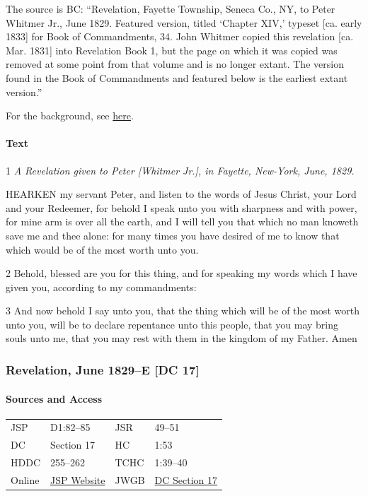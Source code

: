 				The source is BC: ``Revelation, Fayette Township, Seneca Co., NY, to Peter Whitmer Jr., June 1829. Featured version, titled `Chapter XIV,' typeset [ca. early 1833] for Book of Commandments, 34. John Whitmer copied this revelation [ca. Mar. 1831] into Revelation Book 1, but the page on which it was copied was removed at some point from that volume and is no longer extant. The version found in the Book of Commandments and featured below is the earliest extant version.''
				
				For the background, see \hyperref[DC16-HB]{here}.
			
			\paragraph{Text}
			
				1 \textit{A Revelation given to Peter [Whitmer Jr.], in Fayette, New-York, June, 1829.}
				
				HEARKEN my servant Peter, and listen to the words of Jesus Christ, your Lord and your Redeemer, for behold I speak unto you with sharpness and with power, for mine arm is over all the earth, and I will tell you that which no man knoweth save me and thee alone: for many times you have desired of me to know that which would be of the most worth unto you.
				
				2 Behold, blessed are you for this thing, and for speaking my words which I have given you, according to my commandments:

				3 And now behold I say unto you, that the thing which will be of the most worth unto you, will be to declare repentance unto this people, that you may bring souls unto me, that you may rest with them in the kingdom of my Father. Amen
			
		\subsubsection{Revelation, June 1829--E [DC 17]}
			\label{EMS-1828-1829-JS-JUN-1829-E}
			
			\paragraph{Sources and Access}

				\begin{tabular}{p{1in}p{1.5in}p{1in}p{1.5in}}
				JSP	 	& D1:82--85		& JSR 		& 49--51	\\  
				DC	 	& Section 17 	& HC 		& 1:53	 	\\
				HDDC 	& 255--262 		& TCHC 		& 1:39--40	\\
				Online  & \href{https://www.josephsmithpapers.org/paper-summary/revelation-june-1829-e-dc-17/1}{JSP Website} & 
				JWGB	& \hyperref[DC17]{DC Section 17} \\
				\end{tabular}
			
